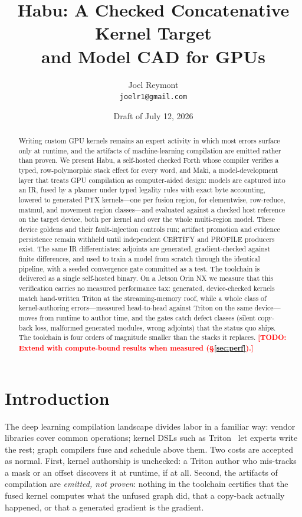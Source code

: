 \documentclass[11pt]{article}
\title{Habu: A Checked Concatenative Kernel Target\\and Model CAD for GPUs}
\author{Joel Reymont\\\texttt{joelr1@gmail.com}}
\date{Draft of July 12, 2026}
\newcommand{\todo}[1]{\textcolor{red}{\textbf{[TODO: #1]}}}
\begin{document}
\maketitle

\begin{abstract}
Writing custom GPU kernels remains an expert activity in which most errors
surface only at runtime, and the artifacts of machine-learning compilation
are emitted rather than proven. We present Habu, a self-hosted checked
Forth whose compiler verifies a typed, row-polymorphic stack effect for
every word, and Maki, a model-development layer that treats GPU compilation
as computer-aided design: models are captured into an IR, fused by a
planner under typed legality rules with exact byte accounting, lowered to
generated PTX kernels---one per fusion region, for elementwise, row-reduce,
matmul, and movement region classes---and evaluated against a checked host
reference on the target device, both per kernel and over the whole
multi-region model. These device goldens and their fault-injection controls
run; artifact promotion and evidence persistence remain withheld until
independent CERTIFY and PROFILE producers exist. The same IR differentiates:
adjoints are generated, gradient-checked against finite differences, and
used to train a model from scratch through the identical pipeline, with a
seeded convergence gate committed as a test. The toolchain is delivered as a
single self-hosted binary. On a Jetson Orin NX we measure
that this verification carries no measured performance tax: generated,
device-checked kernels match hand-written Triton at the streaming-memory
roof, while a whole class of kernel-authoring errors---measured
head-to-head against Triton on the same device---moves from runtime to
author time, and the gates catch defect classes (silent copy-back loss,
malformed generated modules, wrong adjoints) that the status quo ships.
The toolchain is four orders of magnitude smaller than the stacks it
replaces. \todo{Extend with compute-bound results when measured
(\S\ref{sec:perf}).}
\end{abstract}

\section{Introduction}
The deep learning compilation landscape divides labor in a familiar way:
vendor libraries cover common operations; kernel DSLs such as
Triton~\cite{triton} let experts write the rest; graph compilers fuse and
schedule above them. Two costs are accepted as normal. First, kernel
authorship is unchecked: a Triton author who mis-tracks a mask or an
offset discovers it at runtime, if at all. Second, the artifacts of
compilation are \emph{emitted, not proven}: nothing in the toolchain
certifies that the fused kernel computes what the unfused graph did, that
a copy-back actually happened, or that a generated gradient is the
gradient.
\end{document}
